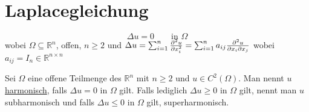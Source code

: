 \section{Laplacegleichung} 
\label{sec:laplacegleichung}

\begin{equation}
	\Delta u = 0 \qquad \text{in }\Omega
\end{equation}
wobei $\Omega \subseteq \mathbb{R}^n$, offen, $n \geq 2$ und $\Delta u = \sum^{n}_{i=1} \frac{{\partial ^2u}}{{\partial x_i^2}}  = \sum^{n}_{i=1} a_{ij} \frac{{\partial ^2u}}{{\partial x_i \partial x_j}} $ wobei $a_{ij}= I_n \in \mathbb{R}^{n \times n}$

\begin{definition}
	Sei $\Omega$ eine offene Teilmenge des $\mathbb{R}^n$ mit $n \geq 2$ und $u \in C^2(\Omega)$. Man nennt $u$ \underline{harmonisch}, falls $\Delta u = 0$ in $\Omega$ gilt. Falls lediglich $\Delta u \geq 0$ in $\Omega$ gilt, nennt man $u$ subharmonisch und falls $\Delta u \leq 0$ in $\Omega$ gilt, superharmonisch.
\end{definition}
	
